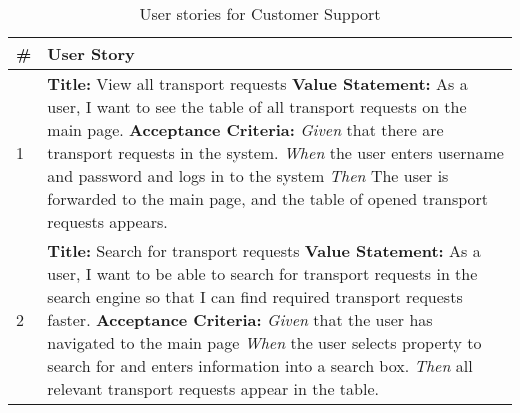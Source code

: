 \documentclass[a4paper]{article}
\begin{document}
               \begin{longtable}[c]{|p{0.5cm}||p{}|}
                   \caption{User stories for Customer Support}
                    \label{customerSupportUserStories} \\
            \hline
            \# & User Story  \\
            \hline
            \endhead
             1 & \textbf{Title:}  View all transport requests  \newline
                 \textbf{Value Statement:} As a user, I want to see the table of all transport requests on the main page. \newline
                  \textbf{Acceptance Criteria:} \newline
                 \emph{Given} that there are transport requests in the system.\newline 
                 \emph{When} the user enters username and password and logs in to the system \newline
                 \emph{Then}  The user is forwarded to the main page, and the table of opened transport requests appears.
             
            \\
             \hline
             2 & \textbf{Title:}  Search for transport requests  \newline
                 \textbf{Value Statement:} As a user, I want to be able to search for transport requests in the search engine so that I can find required transport requests faster. \newline
                   \textbf{Acceptance Criteria:} \newline
                 \emph{Given} that the user has navigated to the main page \newline 
                 \emph{When} the user selects property to search for and enters information into a search box.\newline
                 \emph{Then} all relevant transport requests appear in the table.
             

\end{longtable}
\end{document}
